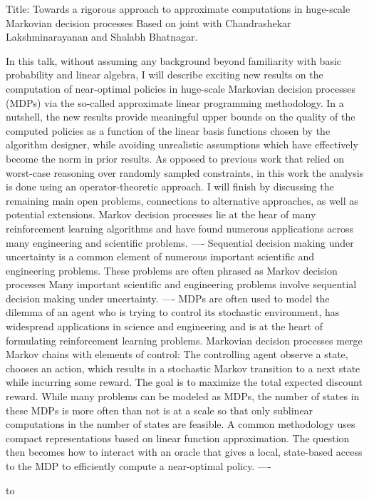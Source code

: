 Title: Towards a rigorous approach to approximate computations in huge-scale Markovian decision processes
Based on joint with Chandrashekar Lakshminarayanan and Shalabh Bhatnagar.

In this talk, without assuming any background beyond familiarity with basic probability and 
linear algebra, I will describe exciting new results on the computation of near-optimal policies in 
huge-scale Markovian decision processes (MDPs) via the so-called approximate linear programming methodology.
In a nutshell, the new results provide meaningful upper bounds on the quality of the computed policies
as a function of the linear basis functions chosen by the algorithm designer, while avoiding unrealistic assumptions
which have effectively become the norm in prior results. 
As opposed to previous work that relied on worst-case reasoning over randomly sampled constraints,
in this work the analysis is done using an operator-theoretic approach.
I will finish by discussing the remaining main open problems, connections to alternative approaches,
as well as potential extensions.
Markov decision processes lie at the hear of many reinforcement learning algorithms and have found
numerous applications across many engineering and scientific problems. 
----
Sequential decision making under uncertainty is a common element of numerous important scientific and engineering problems.
These problems are often phrased as Markov decision processes
Many important scientific and engineering problems involve sequential decision making under uncertainty.
----
MDPs are often used to model the dilemma of an agent who is trying to control its stochastic environment,
has widespread applications in science and engineering and is at the heart of formulating reinforcement learning problems.
Markovian decision processes merge Markov chains with elements of control:
The controlling agent observe a state, chooses an action, which results in a stochastic Markov transition 
to a next state while incurring some reward. The goal is to maximize the total expected discount reward.
While many problems can be modeled as MDPs, the number of states in these MDPs is more often than not is
at a scale so that only sublinear computations in the number of states are feasible. 
A common methodology uses compact representations based on linear function approximation.
The question then becomes how to interact with an oracle that gives a local, state-based access to the MDP
to efficiently compute a near-optimal policy.
----

to

